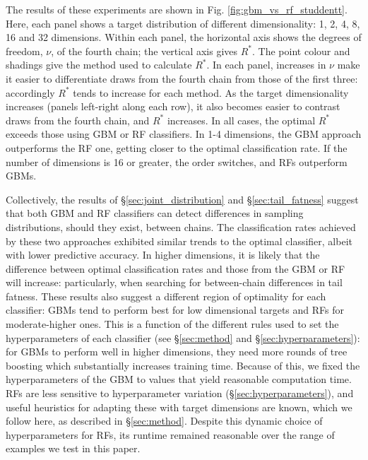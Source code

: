 \documentclass{article}
\begin{document}
The results of these experiments are shown in Fig. \ref{fig:gbm_vs_rf_studdentt}. Here, each panel shows a target distribution of different dimensionality: 1, 2, 4, 8, 16 and 32 dimensions. Within each panel, the horizontal axis shows the degrees of freedom, $\nu$, of the fourth chain; the vertical axis gives $R^*$. The point colour and shadings give the method used to calculate $R^*$. In each panel, increases in $\nu$ make it easier to differentiate draws from the fourth chain from those of the first three: accordingly $R^*$ tends to increase for each method. As the target dimensionality increases (panels left-right along each row), it also becomes easier to contrast draws from the fourth chain, and $R^*$ increases. In all cases, the optimal $R^*$ exceeds those using GBM or RF classifiers. In 1-4 dimensions, the GBM approach outperforms the RF one, getting closer to the optimal classification rate. If the number of dimensions is 16 or greater, the order switches, and RFs outperform GBMs.

Collectively, the results of \S\ref{sec:joint_distribution} and \S\ref{sec:tail_fatness} suggest that both GBM and RF classifiers can detect differences in sampling distributions, should they exist, between chains. The classification rates achieved by these two approaches exhibited similar trends to the optimal classifier, albeit with lower predictive accuracy. In higher dimensions, it is likely that the difference between optimal classification rates and those from the GBM or RF will increase: particularly, when searching for between-chain differences in tail fatness. These results also suggest a different region of optimality for each classifier: GBMs tend to perform best for low dimensional targets and RFs for moderate-higher ones. This is a function of the different rules used to set the hyperparameters of each classifier (see \S\ref{sec:method} and \S\ref{sec:hyperparameters}): for GBMs to perform well in higher dimensions, they need more rounds of tree boosting which substantially increases training time. Because of this, we fixed the hyperparameters of the GBM to values that yield reasonable computation time. RFs are less sensitive to hyperparameter variation (\S\ref{sec:hyperparameters}), and useful heuristics for adapting these with target dimensions are known, which we follow here, as described in \S\ref{sec:method}. Despite this dynamic choice of hyperparameters for RFs, its runtime remained reasonable over the range of examples we test in this paper.
\end{document}
